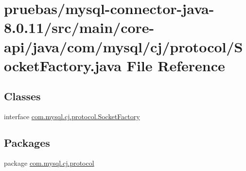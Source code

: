 \hypertarget{main_2core-api_2java_2com_2mysql_2cj_2protocol_2_socket_factory_8java}{}\section{pruebas/mysql-\/connector-\/java-\/8.0.11/src/main/core-\/api/java/com/mysql/cj/protocol/\+Socket\+Factory.java File Reference}
\label{main_2core-api_2java_2com_2mysql_2cj_2protocol_2_socket_factory_8java}
\subsection*{Classes}
\begin{DoxyCompactItemize}
\item 
interface \mbox{\hyperlink{interfacecom_1_1mysql_1_1cj_1_1protocol_1_1_socket_factory}{com.\+mysql.\+cj.\+protocol.\+Socket\+Factory}}
\end{DoxyCompactItemize}
\subsection*{Packages}
\begin{DoxyCompactItemize}
\item 
package \mbox{\hyperlink{namespacecom_1_1mysql_1_1cj_1_1protocol}{com.\+mysql.\+cj.\+protocol}}
\end{DoxyCompactItemize}
